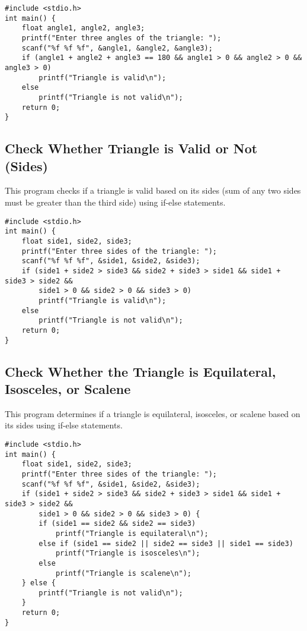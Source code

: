 \documentclass[a4paper,12pt]{article}
\begin{document}
\begin{lstlisting}[caption={Check Whether Triangle is Valid or Not (Angles)}]
#include <stdio.h>
int main() {
    float angle1, angle2, angle3;
    printf("Enter three angles of the triangle: ");
    scanf("%f %f %f", &angle1, &angle2, &angle3);
    if (angle1 + angle2 + angle3 == 180 && angle1 > 0 && angle2 > 0 && angle3 > 0)
        printf("Triangle is valid\n");
    else
        printf("Triangle is not valid\n");
    return 0;
}
\end{lstlisting}

\newpage

\subsection{Check Whether Triangle is Valid or Not (Sides)}
This program checks if a triangle is valid based on its sides (sum of any two sides must be greater than the third side) using if-else statements.

\begin{lstlisting}[caption={Check Whether Triangle is Valid or Not (Sides)}]
#include <stdio.h>
int main() {
    float side1, side2, side3;
    printf("Enter three sides of the triangle: ");
    scanf("%f %f %f", &side1, &side2, &side3);
    if (side1 + side2 > side3 && side2 + side3 > side1 && side1 + side3 > side2 &&
        side1 > 0 && side2 > 0 && side3 > 0)
        printf("Triangle is valid\n");
    else
        printf("Triangle is not valid\n");
    return 0;
}
\end{lstlisting}

\newpage

\subsection{Check Whether the Triangle is Equilateral, Isosceles, or Scalene}
This program determines if a triangle is equilateral, isosceles, or scalene based on its sides using if-else statements.

\begin{lstlisting}[caption={Check Whether the Triangle is Equilateral, Isosceles, or Scalene}]
#include <stdio.h>
int main() {
    float side1, side2, side3;
    printf("Enter three sides of the triangle: ");
    scanf("%f %f %f", &side1, &side2, &side3);
    if (side1 + side2 > side3 && side2 + side3 > side1 && side1 + side3 > side2 &&
        side1 > 0 && side2 > 0 && side3 > 0) {
        if (side1 == side2 && side2 == side3)
            printf("Triangle is equilateral\n");
        else if (side1 == side2 || side2 == side3 || side1 == side3)
            printf("Triangle is isosceles\n");
        else
            printf("Triangle is scalene\n");
    } else {
        printf("Triangle is not valid\n");
    }
    return 0;
}
\end{lstlisting}
\end{document}

